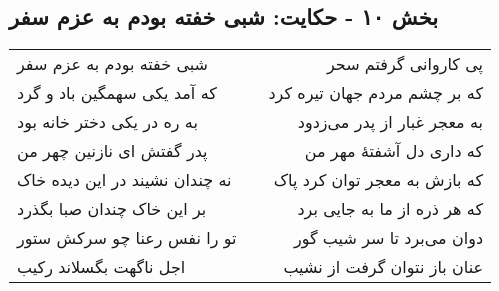 \begin{center}
\section*{بخش ۱۰ - حکایت: شبی خفته بودم به عزم سفر}
\label{sec:010}
\begin{longtable}{l p{0.5cm} r}
شبی خفته بودم به عزم سفر
&&
پی کاروانی گرفتم سحر
\\
که آمد یکی سهمگین باد و گرد
&&
که بر چشم مردم جهان تیره کرد
\\
به ره در یکی دختر خانه بود
&&
به معجر غبار از پدر می‌زدود
\\
پدر گفتش ای نازنین چهر من
&&
که داری دل آشفتهٔ مهر من
\\
نه چندان نشیند در این دیده خاک
&&
که بازش به معجر توان کرد پاک
\\
بر این خاک چندان صبا بگذرد
&&
که هر ذره از ما به جایی برد
\\
تو را نفس رعنا چو سرکش ستور
&&
دوان می‌برد تا سر شیب گور
\\
اجل ناگهت بگسلاند رکیب
&&
عنان باز نتوان گرفت از نشیب
\\
\end{longtable}
\end{center}
